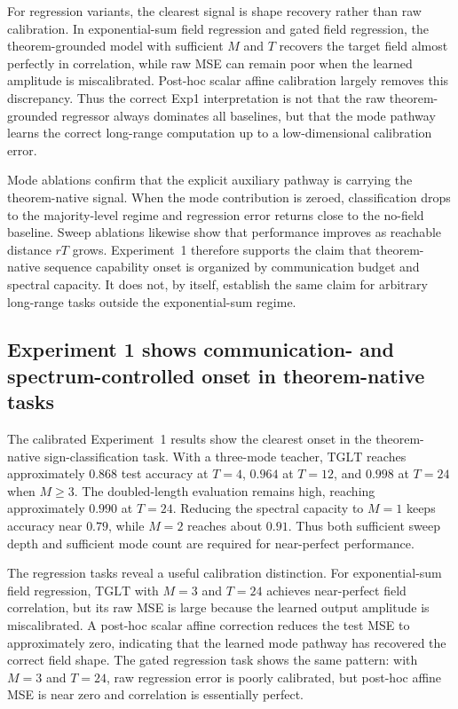 \documentclass[11pt]{article}
\theoremstyle{definition}
\newcommand{\TGLT}{\ensuremath{\mathrm{TGLT}}}
\begin{document}
For regression variants, the clearest signal is shape recovery rather than raw calibration. In exponential-sum field regression and gated field regression, the theorem-grounded model with sufficient \(M\) and \(T\) recovers the target field almost perfectly in correlation, while raw MSE can remain poor when the learned amplitude is miscalibrated. Post-hoc scalar affine calibration largely removes this discrepancy. Thus the correct Exp1 interpretation is not that the raw theorem-grounded regressor always dominates all baselines, but that the mode pathway learns the correct long-range computation up to a low-dimensional calibration error.

Mode ablations confirm that the explicit auxiliary pathway is carrying the theorem-native signal. When the mode contribution is zeroed, classification drops to the majority-level regime and regression error returns close to the no-field baseline. Sweep ablations likewise show that performance improves as reachable distance \(rT\) grows. Experiment~1 therefore supports the claim that theorem-native sequence capability onset is organized by communication budget and spectral capacity. It does not, by itself, establish the same claim for arbitrary long-range tasks outside the exponential-sum regime.

\subsection*{Experiment 1 shows communication- and spectrum-controlled onset in theorem-native tasks}

The calibrated Experiment~1 results show the clearest onset in the theorem-native sign-classification task. With a three-mode teacher, \TGLT{} reaches approximately \(0.868\) test accuracy at \(T=4\), \(0.964\) at \(T=12\), and \(0.998\) at \(T=24\) when \(M\ge 3\). The doubled-length evaluation remains high, reaching approximately \(0.990\) at \(T=24\). Reducing the spectral capacity to \(M=1\) keeps accuracy near \(0.79\), while \(M=2\) reaches about \(0.91\). Thus both sufficient sweep depth and sufficient mode count are required for near-perfect performance.

The regression tasks reveal a useful calibration distinction. For exponential-sum field regression, \TGLT{} with \(M=3\) and \(T=24\) achieves near-perfect field correlation, but its raw MSE is large because the learned output amplitude is miscalibrated. A post-hoc scalar affine correction reduces the test MSE to approximately zero, indicating that the learned mode pathway has recovered the correct field shape. The gated regression task shows the same pattern: with \(M=3\) and \(T=24\), raw regression error is poorly calibrated, but post-hoc affine MSE is near zero and correlation is essentially perfect.
\end{document}

